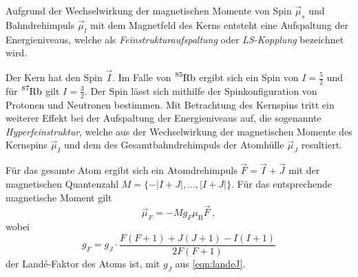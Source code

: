     Aufgrund der Wechselwirkung der magnetischen Momente von Spin $\vec{\mu}_s$ und Bahndrehimpuls $\vec{\mu}_l$ mit dem Magnetfeld des Kerns entsteht eine Aufspaltung der Energieniveaus,
    welche als \textit{Feinstrukturaufspaltung} oder \textit{LS-Kopplung} bezeichnet wird.

    Der Kern hat den Spin $\vec{I}$.
    Im Falle von $\ce{^{85}Rb}$ ergibt sich ein Spin von $I = \frac{5}{2}$ und für $\ce{^{87}Rb}$ gilt $I = \frac{3}{2}$.
    Der Spin lässt sich mithilfe der Spinkonfiguration von Protonen und Neutronen bestimmen.
    Mit Betrachtung des Kernspins tritt ein weiterer Effekt bei der Aufspaltung der Energieniveaus auf,
    die sogenannte \textit{Hyperfeinstruktur},
    welche aus der Wechselwirkung der magnetischen Momente des Kernspins $\vec{\mu}_I$ und dem des Gesamtbahndrehimpuls der Atomhülle $\vec{\mu}_J$ resultiert.

    Für das gesamte Atom ergibt sich ein Atomdrehimpuls $\vec{F} = \vec{I} + \vec{J}$ mit der magnetischen Quantenzahl $M = \{-\lvert I+J \rvert, ..., \lvert I+J \rvert\}$.
    Für das entsprechende magnetische Moment gilt
    \begin{equation}
        \vec{\mu}_F = - M g_F \mu_\text{B} \vec{F} \ ,
    \end{equation}
    wobei
    \begin{equation}
        g_F = g_J \cdot \frac{F(F+1) + J(J+1) - I(I+1)}{2F(F+1)}
        \label{eqn:landeF}
    \end{equation}
    der Landé-Faktor des Atoms ist,
    mit $g_J$ aus \autoref{eqn:landeJ}.

